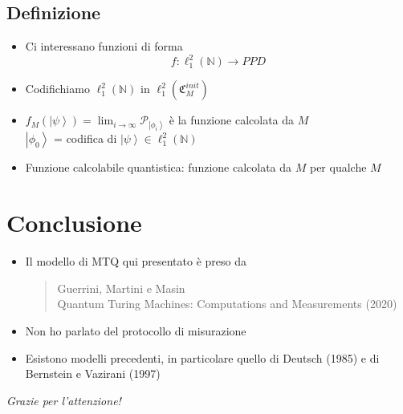 \documentclass{beamer}
\newcommand{\ket}[1]{\left | #1 \right \rangle}
\newcommand{\conf}{\mathfrak{C}_{M}}
\newcommand{\hil}{\ell^{2}}
\newcommand{\hiluninorm}{\hil_{1}}
\begin{document}
\subsection{Definizione}

\begin{frame}{\secname}{}
	\begin{itemize}
		\item<+-> Ci interessano funzioni di forma \[ f : \hiluninorm \left ( \mathbb{N} \right ) \rightarrow PPD \]
		\item<+-> Codifichiamo \( \hiluninorm \left ( \mathbb{N} \right ) \) in \( \hiluninorm \left ( \conf^{init} \right ) \)
		\item<+-> \( f_M(\ket{\psi}) = \lim_{i \to \infty} \mathcal{P}_{\ket{\phi_{i}}} \) è la \alert{funzione calcolata} da \(M\) \\
		\(\ket{\phi_0}\) = codifica di \(\ket{\psi} \in \hiluninorm \left ( \mathbb{N} \right )\)
		\item<+-> \alert{Funzione calcolabile quantistica}: funzione calcolata da \(M\) per qualche \(M\)
	\end{itemize}
\end{frame}

\section{Conclusione}

\begin{frame}{\secname}{}
	\begin{itemize}
		\item<+-> Il modello di MTQ qui presentato è preso da\\
		\begin{quote}
			Guerrini, Martini e Masin \\
			Quantum Turing Machines: Computations and Measurements (2020)
		\end{quote}
		\item<+-> Non ho parlato del protocollo di misurazione
		\item<+-> Esistono modelli precedenti, in particolare quello di Deutsch (1985) e di Bernstein e Vazirani (1997)
	\end{itemize}
\end{frame}

\begin{frame}{}
	\centering \huge
	\emph{Grazie per l'attenzione!}
\end{frame}
\end{document}
